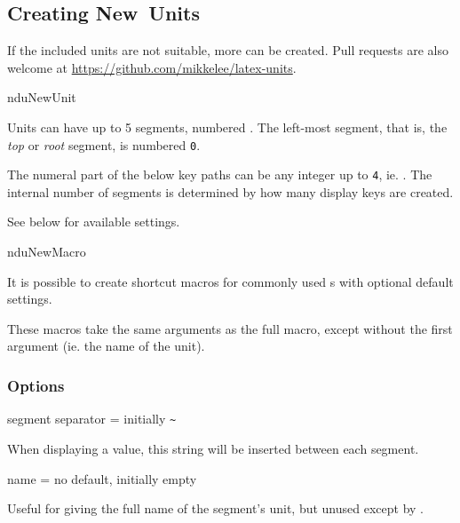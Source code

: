 \documentclass{article}
\begin{document}
\subsection{Creating New Units} %

If the included units are not suitable, more can be created. Pull requests are also welcome at \url{https://github.com/mikkelee/latex-units}.

\begin{docCommand}
	{nduNewUnit}
	{}
	
Units can have up to 5 segments, numbered . The left-most segment, that is, the \emph{top} or \emph{root} segment, is numbered \texttt{0}.

The numeral part of the below key paths  can be any integer up to \texttt{4}, ie. . The internal number of segments is determined by how many display keys are created.

See below for available settings.

\end{docCommand}

\begin{docCommand}
	{nduNewMacro}
	{}

	It is possible to create shortcut macros for commonly used s with optional default settings.

	These macros take the same arguments as the full  macro, except without the first argument (ie. the name of the unit).

\end{docCommand}


\subsubsection{Options}

\begin{docKey}
	{segment separator}
	{=}
	{initially \texttt{\~{}}}
	
	When displaying a value, this string will be inserted between each segment.
\end{docKey}

\begin{docKey}
	[segment 0]{name}
	{=}
	{no default, initially empty}

	Useful for giving the full name of the segment's unit, but unused except by .
\end{docKey}
\end{document}
